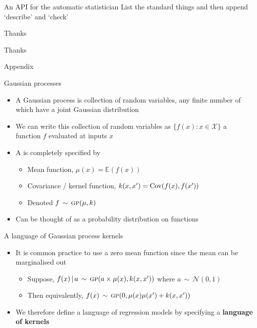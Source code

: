 \begin{frame}{An API for the automatic statistician}
  List the standard things and then append `describe' and `check'
\end{frame}

\begin{frame}{Thanks}
  \begin{center}
  \Huge
  Thanks
  \end{center}
\end{frame}

\begin{frame}{Appendix}
\end{frame}

\begin{frame}{Gaussian processes}
  \begin{itemize}
    \item A Gaussian process is collection of random variables, any finite number of which have a joint Gaussian distribution
    \pause
    \vspace{\baselineskip}
    \item We can write this collection of random variables as $\{f(x) : x \in \mathcal{X}\}$ \ie a function $f$ evaluated at inputs $x$
    \pause
    \vspace{\baselineskip}
    \item A \gp{} is completely specified by
    \begin{itemize}
      \item Mean function, $\mu(x)=\mathbb{E}(f(x))$
      \item Covariance / kernel function, $k(x,x') = \operatorname{Cov}(f(x),f(x'))$
      \item Denoted $f \,\sim\, {\textsc{gp}}{}(\mu,k)$
    \end{itemize}
    \vspace{\baselineskip}
    \pause
    \item Can be thought of as a probability distribution on functions
  \end{itemize}
\end{frame}

\begin{frame}{A language of Gaussian process kernels}
  \begin{itemize}
    \item It is common practice to use a zero mean function since the mean can be marginalised out
  \begin{itemize}
    \item Suppose, ${f(x) \,|\, a \,\sim\, {\textsc{gp}}{}(a \times \mu(x), k(x,x'))}$ where $a \,\sim\, \mathcal{N}(0,1)$
    \item Then equivalently, $f(x) \,\sim\, {\textsc{gp}}{}(0, \mu(x)\mu(x') + k(x,x'))$
  \end{itemize}
  \vspace{\baselineskip}
  \item We therefore define a language of \gp{} regression models by
specifying a {\bf language of kernels}
  \end{itemize}
\end{frame}



